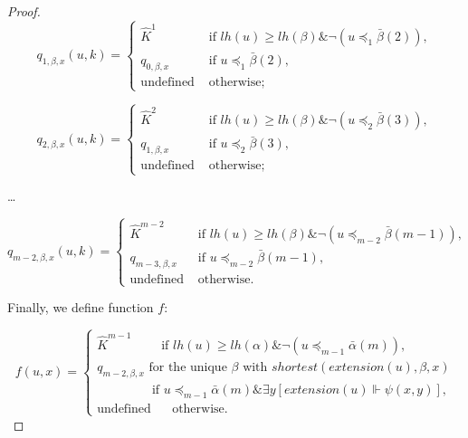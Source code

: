 \documentclass{asl}
\theoremstyle{definition}
\begin{document}
\begin{proof}
\begin{displaymath}
q_{1,\beta,x}(u,k)=
\begin{cases}
\widehat{K}^1 & \text{if } lh(u)\geqslant lh(\beta) \& \neg(u\preccurlyeq_1\bar{\beta}(2)),\\
q_{0,\beta, x}  & \text{if } u\preccurlyeq_1\bar{\beta}(2),\\
\text{undefined } & \text{otherwise;}
\end{cases}
\end{displaymath} 

\begin{displaymath}
q_{2,\beta,x}(u,k)=
\begin{cases}
\widehat{K}^2 & \text{if } lh(u)\geqslant lh(\beta) \& \neg(u\preccurlyeq_2\bar{\beta}(3)),\\
q_{1,\beta, x}  & \text{if } u\preccurlyeq_2\bar{\beta}(3),\\
\text{undefined } & \text{otherwise;}
\end{cases}
\end{displaymath} 

\begin{center}
\ldots
\end{center}

\begin{displaymath}
q_{m-2,\beta,x}(u,k)=
\begin{cases}
\widehat{K}^{m-2} & \text{if } lh(u)\geqslant lh(\beta) \& \neg(u\preccurlyeq_{m-2}\bar{\beta}(m-1)),\\
q_{m-3,\beta, x}  & \text{if } u\preccurlyeq_{m-2}\bar{\beta}(m-1),\\
\text{undefined } & \text{otherwise.}
\end{cases}
\end{displaymath} 

Finally, we define function $f$:

\begin{displaymath}
f(u,x)=
\begin{cases}
\widehat{K}^{m-1} \qquad \text{ if } lh(u)\geqslant lh(\alpha) \& \neg(u\preccurlyeq_{m-1}\bar{\alpha}(m)),\\
q_{m-2,\beta, x} \text{ for the unique } \beta \text{ with } shortest(extension(u),\beta,x) \\ 
\qquad \qquad \text{ if } u\preccurlyeq_{m-1}\bar{\alpha}(m) \& \exists y\left[extension(u)\Vdash \psi(x,y)\right] ,\\
\text{undefined } \quad \text{ otherwise.}
\end{cases}
\end{displaymath} 


\end{proof}
\end{document}
